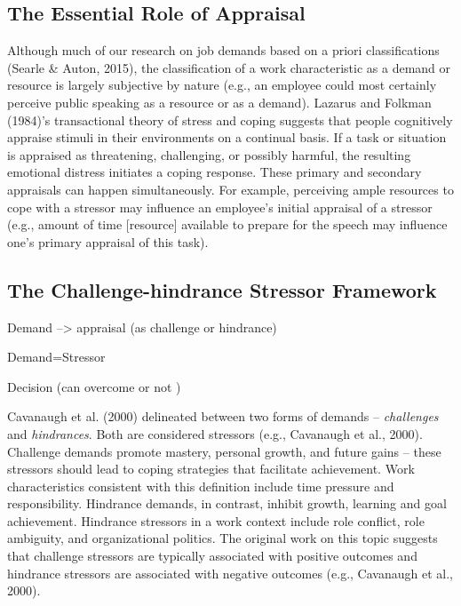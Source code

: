 \documentclass[
  jou,mask]{apa6}
\begin{document}
\hypertarget{the-essential-role-of-appraisal}{%
\subsection{The Essential Role of Appraisal}\label{the-essential-role-of-appraisal}}

Although much of our research on job demands based on a priori classifications (Searle \& Auton, 2015), the classification of a work characteristic as a demand or resource is largely subjective by nature (e.g., an employee could most certainly perceive public speaking as a resource or as a demand). Lazarus and Folkman (1984)'s transactional theory of stress and coping suggests that people cognitively appraise stimuli in their environments on a continual basis. If a task or situation is appraised as threatening, challenging, or possibly harmful, the resulting emotional distress initiates a coping response. These primary and secondary appraisals can happen simultaneously. For example, perceiving ample resources to cope with a stressor may influence an employee's initial appraisal of a stressor (e.g., amount of time {[}resource{]} available to prepare for the speech may influence one's primary appraisal of this task).

\hypertarget{the-challenge-hindrance-stressor-framework}{%
\subsection{The Challenge-hindrance Stressor Framework}\label{the-challenge-hindrance-stressor-framework}}

Demand --\textgreater{} appraisal (as challenge or hindrance)

Demand=Stressor

Decision (can overcome or not )

Cavanaugh et al. (2000) delineated between two forms of demands -- \emph{challenges} and \emph{hindrances}. Both are considered stressors (e.g., Cavanaugh et al., 2000). Challenge demands promote mastery, personal growth, and future gains -- these stressors should lead to coping strategies that facilitate achievement. Work characteristics consistent with this definition include time pressure and responsibility. Hindrance demands, in contrast, inhibit growth, learning and goal achievement. Hindrance stressors in a work context include role conflict, role ambiguity, and organizational politics. The original work on this topic suggests that challenge stressors are typically associated with positive outcomes and hindrance stressors are associated with negative outcomes (e.g., Cavanaugh et al., 2000).
\end{document}
